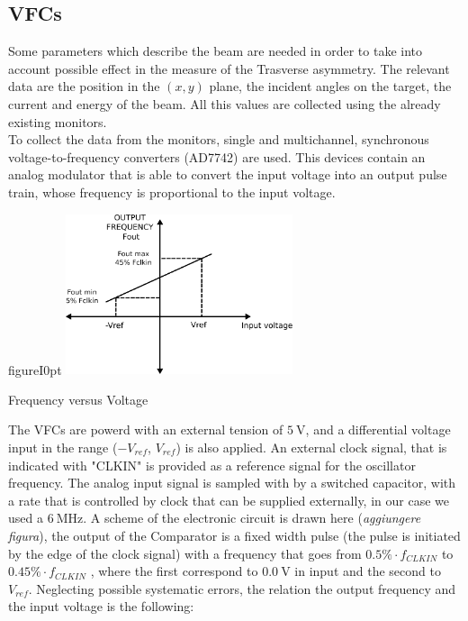 \subsection{VFCs}

Some parameters which describe the beam are needed in order to take into account possible effect in the measure of the Trasverse asymmetry. The relevant data are the position in the $(x,y)$ plane, the incident angles on the target, the current and energy of the beam. All this values are collected using the already existing monitors. \\
To collect the data from the monitors, single and multichannel, synchronous voltage-to-frequency converters (AD7742) are used. This devices contain an analog modulator that is able to convert the input voltage into an output pulse train, whose frequency is proportional to the input voltage. 

\begin{wrapfloat}{figure}{I}{0pt}
\includegraphics[width=0.5\textwidth]{ExperimentalSetup/Vfc.pdf}
\caption{Frequency versus Voltage}
\end{wrapfloat}

The VFCs are powerd with an external tension of $\SI{5}{\volt}$, and a differential voltage input in the range ($-V_{ref}$, $V_{ref}$) is also applied. An external clock signal, that is indicated with "CLKIN" is provided as a reference signal for the oscillator frequency.
The analog input signal is sampled with by a switched capacitor, with a rate that is controlled by clock that can be supplied externally, in our case we used a $\SI{6}{\mega \hertz}$. A scheme of the electronic circuit is drawn here (\textit{aggiungere figura}), the output of the Comparator  is a fixed width pulse (the pulse is initiated by the edge of the clock signal) with a frequency that goes from $0.5 \% \cdot f_{CLKIN}$ to $0.45 \% \cdot f_{CLKIN}$ \cite{VfcDatasheet}, where the first correspond to $\SI{0.0}{ \volt}$ in input and the second to $V_{ref}$. Neglecting possible systematic errors, the relation the output frequency and the input voltage is the following:

